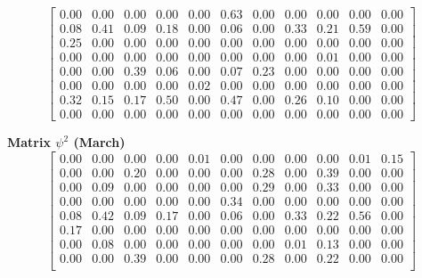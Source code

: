 \documentclass[a4paper,fleqn]{cas-dc}
\begin{document}
\begin{scriptsize}
\[\begin{bmatrix}
0.00 & 0.00 & 0.00 & 0.00 & 0.00 & 0.63 & 0.00 & 0.00 & 0.00 & 0.00 & 0.00\\

0.08 & 0.41 & 0.09 & 0.18 & 0.00 & 0.06 & 0.00 & 0.33 & 0.21 & 0.59 & 0.00\\

0.25 & 0.00 & 0.00 & 0.00 & 0.00 & 0.00 & 0.00 & 0.00 & 0.00 & 0.00 & 0.00\\

0.00 & 0.00 & 0.00 & 0.00 & 0.00 & 0.00 & 0.00 & 0.00 & 0.01 & 0.00 & 0.00\\

0.00 & 0.00 & 0.39 & 0.06 & 0.00 & 0.07 & 0.23 & 0.00 & 0.00 & 0.00 & 0.00\\

0.00 & 0.00 & 0.00 & 0.00 & 0.02 & 0.00 & 0.00 & 0.00 & 0.00 & 0.00 & 0.00\\

0.32 & 0.15 & 0.17 & 0.50 & 0.00 & 0.47 & 0.00 & 0.26 & 0.10 & 0.00 & 0.00\\

0.00 & 0.00 & 0.00 & 0.00 & 0.00 & 0.00 & 0.00 & 0.00 & 0.00 & 0.00 & 0.00

\end{bmatrix}
\]

\textbf{Matrix $\psi^{2}$ (March)}
\[
\begin{bmatrix}

0.00 & 0.00 & 0.00 & 0.00 & 0.01 & 0.00 & 0.00 & 0.00 & 0.00 & 0.01 & 0.15\\

0.00 & 0.00 & 0.20 & 0.00 & 0.00 & 0.00 & 0.28 & 0.00 & 0.39 & 0.00 & 0.00\\

0.00 & 0.09 & 0.00 & 0.00 & 0.00 & 0.00 & 0.29 & 0.00 & 0.33 & 0.00 & 0.00\\

0.00 & 0.00 & 0.00 & 0.00 & 0.00 & 0.34 & 0.00 & 0.00 & 0.00 & 0.00 & 0.00\\

0.08 & 0.42 & 0.09 & 0.17 & 0.00 & 0.06 & 0.00 & 0.33 & 0.22 & 0.56 & 0.00\\

0.17 & 0.00 & 0.00 & 0.00 & 0.00 & 0.00 & 0.00 & 0.00 & 0.00 & 0.00 & 0.00\\

0.00 & 0.08 & 0.00 & 0.00 & 0.00 & 0.00 & 0.00 & 0.01 & 0.13 & 0.00 & 0.00\\

0.00 & 0.00 & 0.39 & 0.00 & 0.00 & 0.00 & 0.28 & 0.00 & 0.22 & 0.00 & 0.00\\


\end{bmatrix}\]
\end{scriptsize}
\end{document}
